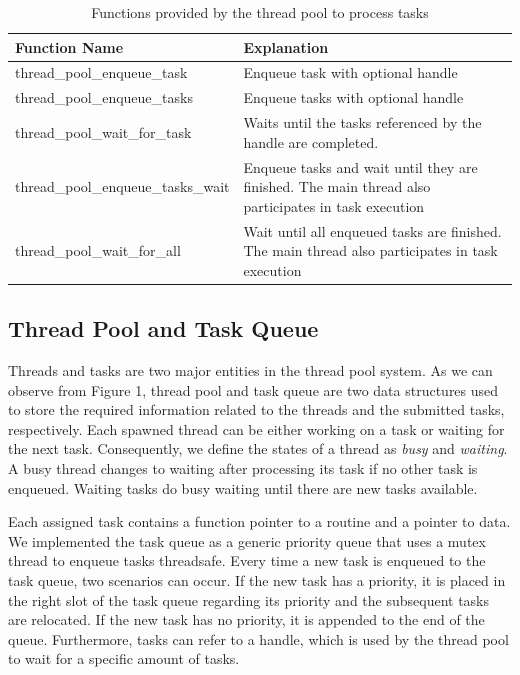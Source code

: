 \documentclass[conference]{IEEEtran}
\begin{document}
\begin{table}[htbp]
	\caption{Functions provided by the thread pool to process tasks}
	\begin{center}
		\begin{tabular}{ l l }
			\hline
			\textbf{Function Name}&\textbf{Explanation}\\
			\hline
			thread\_pool\_enqueue\_task & Enqueue task with optional handle \\
			thread\_pool\_enqueue\_tasks & Enqueue tasks with optional handle \\
			thread\_pool\_wait\_for\_task & Waits until the tasks referenced by the handle are completed. \\
			thread\_pool\_enqueue\_tasks\_wait & Enqueue tasks and wait until they are finished. The main thread also participates in task execution\\
			thread\_pool\_wait\_for\_all & Wait until all enqueued tasks are finished. The main thread also participates in task execution \\ \hline
		\end{tabular}
		\label{tab1}
	\end{center}
\end{table}

\subsection{Thread Pool and Task Queue}
Threads and tasks are two major entities in the thread pool system. As we can observe from Figure 1, thread pool and task queue are two data structures used to store the required information related to the threads and the submitted tasks, respectively. Each spawned thread can be either working on a task or waiting for the next task. Consequently, we define the states of a thread as \emph{busy} and \emph{waiting}. A busy thread changes to waiting after processing its task if no other task is enqueued. Waiting tasks do busy waiting until there are new tasks available.

Each assigned task contains a function pointer to a routine and a pointer to data. We implemented the task queue as a generic priority queue that uses a mutex thread to enqueue tasks threadsafe. Every time a new task is enqueued to the task queue, two scenarios can occur. If the new task has a priority, it is placed in the right slot of the task queue regarding its priority and the subsequent tasks are relocated. If the  new task has no priority, it is appended to the end of the queue. Furthermore, tasks can refer to a handle, which is used by the thread pool to wait for a specific amount of tasks.
\end{document}
